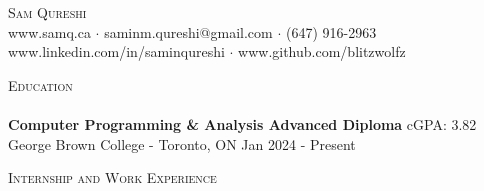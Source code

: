 \documentclass[letterpaper]{article} %
\newcommand{\lineunder} {
    \vspace*{-8pt} \\
    \hspace*{-18pt} \hrulefill \\
}
\newcommand{\header} [1] {
    {\hspace*{-18pt}\vspace*{6pt} \textsc{#1}}
    \vspace*{-6pt} \lineunder
}
\begin{document}
\vspace*{-40pt}

\vspace*{-10pt}
\begin{center}
    {\Huge \scshape {Sam Qureshi}}\\
    www.samq.ca $\cdot$ saminm.qureshi@gmail.com $\cdot$ (647) 916-2963 \\
    www.linkedin.com/in/saminqureshi $\cdot$ www.github.com/blitzwolfz\\
\end{center}

\header{Education}
\textbf{Computer Programming \& Analysis Advanced Diploma} \hfill cGPA: 3.82\\
George Brown College - Toronto, ON \hfill Jan 2024 - Present \\
\vspace{4mm}
\vspace{1mm}

\header{Internship and Work Experience}
\end{document}

